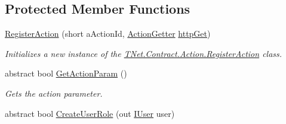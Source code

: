 \subsection*{Protected Member Functions}
\begin{DoxyCompactItemize}
\item 
\mbox{\hyperlink{class_t_net_1_1_contract_1_1_action_1_1_register_action_ab61f9dd635690216354a4395230fa3ca}{Register\+Action}} (short a\+Action\+Id, \mbox{\hyperlink{class_t_net_1_1_service_1_1_action_getter}{Action\+Getter}} \mbox{\hyperlink{class_t_net_1_1_service_1_1_base_struct_a04c1171f14d9ee44612f9966a8d61d30}{http\+Get}})
\begin{DoxyCompactList}\small\item\em Initializes a new instance of the \mbox{\hyperlink{class_t_net_1_1_contract_1_1_action_1_1_register_action}{T\+Net.\+Contract.\+Action.\+Register\+Action}} class. \end{DoxyCompactList}\item 
abstract bool \mbox{\hyperlink{class_t_net_1_1_contract_1_1_action_1_1_register_action_ae573eec630a7072a1dd9e379470934b5}{Get\+Action\+Param}} ()
\begin{DoxyCompactList}\small\item\em Gets the action parameter. \end{DoxyCompactList}\item 
abstract bool \mbox{\hyperlink{class_t_net_1_1_contract_1_1_action_1_1_register_action_a52920632cff858dc295f539a356094f8}{Create\+User\+Role}} (out \mbox{\hyperlink{interface_t_net_1_1_context___1_1_i_user}{I\+User}} user)
\end{DoxyCompactItemize}
